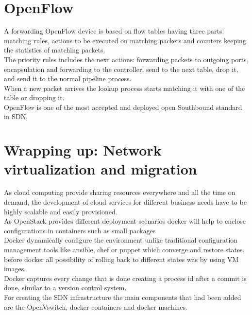 \section{OpenFlow}
 
A forwarding OpenFlow device is based on flow tables having three parts: matching rules, actions to be executed on matching packets and counters keeping the statistics of matching packets.\\
 
The priority rules includes the next actions: forwarding packets to outgoing ports, encapsulation and forwarding to the controller, send to the next table, drop it, and send it to the normal pipeline process.\\
When a new packet arrives the lookup process starts matching it with one of the table or dropping it.\\

OpenFlow is one of the most accepted and deployed open Southbound standard in SDN.\\

\section{Wrapping up: Network virtualization and migration}

As cloud computing provide sharing resources everywhere and all the time on demand, the development of cloud services for different business needs have to be highly scalable and easily provisioned. \\

As OpenStack provides different deployment scenarios docker will help to enclose configurations in containers such as small packages\\ 

Docker dynamically configure the environment unlike traditional configuration management tools like ansible, chef or puppet which converge and restore states, before docker all possibility of rolling back to different states was by using VM images.\\ 

Docker captures every change that is done creating a process id after a commit is done, similar to a version control system.\cite{2}\\
   
For creating the SDN infrastructure the main components that had been added are the OpenVswitch, docker containers and docker machines.\\ 

